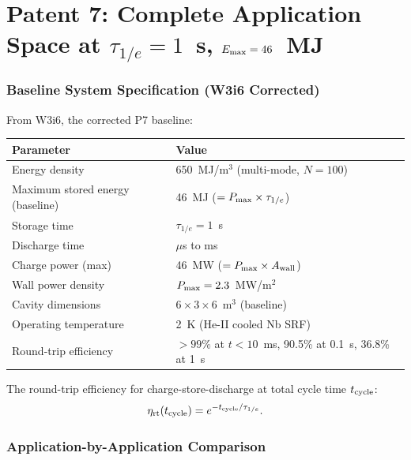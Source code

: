 \documentclass[11pt]{article}
\newcommand{\Pmax}{P_{\rm max}}
\begin{document}
\part{Patent 7: Complete Application Space at $\tau_{1/e} = 1$~s, $E_{\rm max} = 46$~MJ}
\label{part:P7}

\section{Baseline System Specification (W3i6 Corrected)}
\label{sec:P7-baseline}

From W3i6, the corrected P7 baseline:
\begin{center}
\begin{tabular}{ll}
\toprule
Parameter & Value \\
\midrule
Energy density & 650~MJ/m$^3$ (multi-mode, $N = 100$) \\
Maximum stored energy (baseline) & 46~MJ ($= \Pmax \times \tau_{1/e}$) \\
Storage time & $\tau_{1/e} = 1$~s \\
Discharge time & $\mu$s to ms \\
Charge power (max) & 46~MW ($= \Pmax \times A_{\rm wall}$) \\
Wall power density & $\Pmax = 2.3$~MW/m$^2$ \\
Cavity dimensions & $6\times 3\times 6$~m$^3$ (baseline) \\
Operating temperature & 2~K (He-II cooled Nb SRF) \\
Round-trip efficiency & $>99\%$ at $t < 10$~ms, 90.5\% at 0.1~s, 36.8\% at 1~s \\
\bottomrule
\end{tabular}
\end{center}

\noindent The round-trip efficiency for charge-store-discharge at total
cycle time $t_{\rm cycle}$:
\begin{equation}
\eta_{\rm rt}(t_{\rm cycle}) = e^{-t_{\rm cycle}/\tau_{1/e}}.
\label{eq:round-trip-eta}
\end{equation}

\section{Application-by-Application Comparison}
\label{sec:P7-apps}
\end{document}
